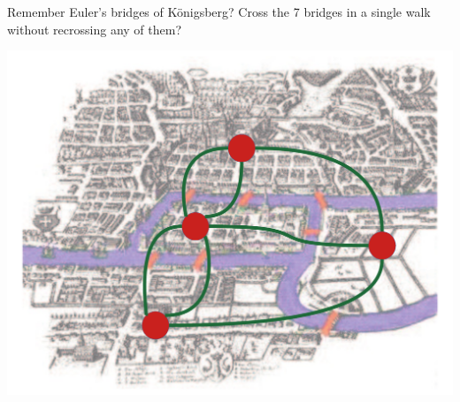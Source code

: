 \documentclass[aspectratio=43]{beamer}
\begin{document}
\begin{frame}{Remember Euler's bridges of K\"onigsberg?}
	Cross the 7 bridges in a single walk without recrossing any of them?
	\begin{center}
	\includegraphics[width=.9\textwidth]{FIGS_slides/bridge_color_with_graph}
	\end{center}
\end{frame}
\end{document}
